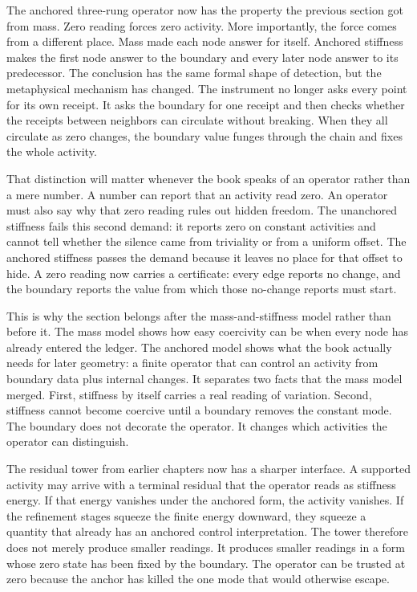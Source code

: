 The anchored three-rung operator now has the property the previous section got
from mass. Zero reading forces zero activity. More importantly, the force comes
from a different place. Mass made each node answer for itself. Anchored
stiffness makes the first node answer to the boundary and every later node
answer to its predecessor. The conclusion has the same formal shape of
detection, but the metaphysical mechanism has changed. The instrument no longer
asks every point for its own receipt. It asks the boundary for one receipt and
then checks whether the receipts between neighbors can circulate without
breaking. When they all circulate as zero changes, the boundary value funges
through the chain and fixes the whole activity.

That distinction will matter whenever the book speaks of an operator rather
than a mere number. A number can report that an activity read zero. An operator
must also say why that zero reading rules out hidden freedom. The unanchored
stiffness fails this second demand: it reports zero on constant activities and
cannot tell whether the silence came from triviality or from a uniform offset.
The anchored stiffness passes the demand because it leaves no place for that
offset to hide. A zero reading now carries a certificate: every edge reports no
change, and the boundary reports the value from which those no-change reports
must start.

This is why the section belongs after the mass-and-stiffness model rather than
before it. The mass model shows how easy coercivity can be when every node has
already entered the ledger. The anchored model shows what the book actually
needs for later geometry: a finite operator that can control an activity from
boundary data plus internal changes. It separates two facts that the mass model
merged. First, stiffness by itself carries a real reading of variation. Second,
stiffness cannot become coercive until a boundary removes the constant mode. The
boundary does not decorate the operator. It changes which activities the
operator can distinguish.

The residual tower from earlier chapters now has a sharper interface. A
supported activity may arrive with a terminal residual that the operator reads
as stiffness energy. If that energy vanishes under the anchored form, the
activity vanishes. If the refinement stages squeeze the finite energy downward,
they squeeze a quantity that already has an anchored control interpretation.
The tower therefore does not merely produce smaller readings. It produces
smaller readings in a form whose zero state has been fixed by the boundary. The
operator can be trusted at zero because the anchor has killed the one mode that
would otherwise escape.

